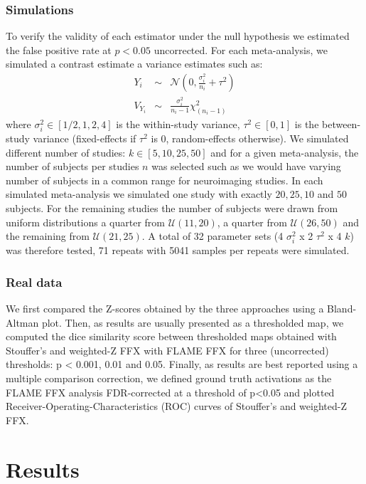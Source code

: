 \documentclass{llncs}
\newcommand{\effectvector}{Y}
\newcommand{\effect}[1][i]{\effectvector_{#1}}
\newcommand{\vareffect}[1][i]{V_{\effect[#1]}}
\newcommand{\nStudies}{k}
\newcommand{\varBetween}{\tau^2}
\newcommand{\sampleSize}[1][i]{n_{#1}}
\newcommand{\varWithin}[1][i]{\sigma^2_{#1}}
\begin{document}
\subsubsection{Simulations}
To verify the validity of each estimator under the null hypothesis we estimated the false positive rate at $p<0.05$ uncorrected. For each meta-analysis, we simulated a contrast estimate a variance estimates such as:
\begin{eqnarray}
	\effect &\sim& \mathcal{N}(0, \frac{\varWithin}{\sampleSize}+\varBetween) \\
	\vareffect &\sim& \frac{\varWithin}{\sampleSize-1} \chi^2_{(\sampleSize-1)}%
\end{eqnarray}
where $\varWithin \in [1/2, 1, 2, 4]$ is the within-study variance, $\varBetween \in [0, 1]$ is the between-study variance (fixed-effects if $\varBetween$ is $0$, random-effects otherwise). We simulated different number of studies: $\nStudies \in [5, 10, 25, 50]$ and for a given meta-analysis, the number of subjects per studies $n$ was selected such as we would have varying number of subjects in a common range for neuroimaging studies. In each simulated meta-analysis we simulated one study with exactly $20, 25, 10$ and $50$ subjects. For the remaining studies the number of subjects were drawn from uniform distributions a quarter from $\mathcal{U}(11,20)$, a quarter from $\mathcal{U}(26,50)$ and the remaining from $\mathcal{U}(21,25)$. A total of 32 parameter sets (4 $\varWithin$ x 2 $\varBetween$ x 4 $\nStudies$) was therefore tested, 71 repeats with 5041 samples per repeats were simulated.


\subsubsection{Real data}

We first compared the Z-scores obtained by the three approaches using a Bland-Altman plot. Then, as results are usually presented as a thresholded map, we computed the dice similarity score between thresholded maps obtained with Stouffer's and weighted-Z FFX with FLAME FFX for three (uncorrected) thresholds: p < 0.001, 0.01 and 0.05. Finally, as results are best reported using a multiple comparison correction, we defined ground truth activations as the FLAME FFX analysis FDR-corrected at a threshold of p<0.05 and plotted Receiver-Operating-Characteristics (ROC) curves of Stouffer's and weighted-Z FFX.

\section{Results}
\end{document}
